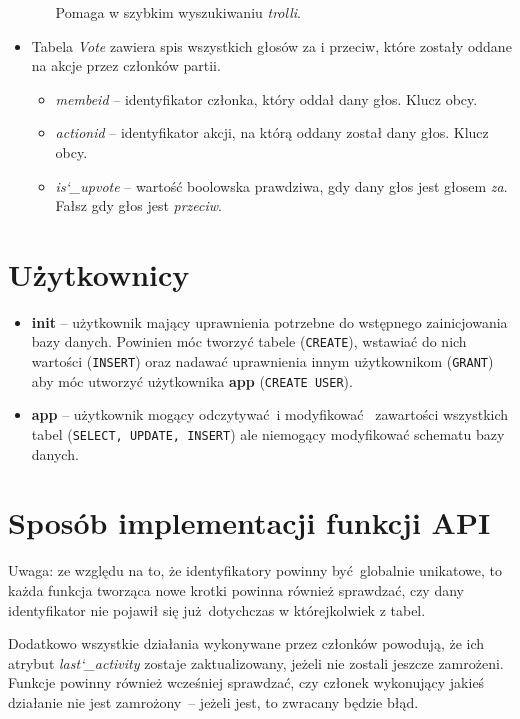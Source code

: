 \documentclass[12pt]{article}
\begin{document}
\begin{itemize}
\begin{itemize}
{              Pomaga w szybkim wyszukiwaniu \textit{trolli}.}
    \end{itemize}
    \item{Tabela \textit{Vote} zawiera spis wszystkich głosów za i przeciw, 
          które zostały oddane na akcje przez członków partii.}
    \begin{itemize}
        \item{\textit{membeid} -- identyfikator członka, który oddał dany głos.
              Klucz obcy.}
        \item{\textit{actionid} -- identyfikator akcji, na którą oddany został
              dany głos. Klucz obcy.}
        \item{\textit{is\char`_upvote} -- wartość boolowska prawdziwa, gdy dany
              głos jest głosem \textit{za}. Fałsz gdy głos jest \textit{przeciw}.}
    \end{itemize}
\end{itemize}

\section{Użytkownicy}

\begin{itemize}
    \item{\textbf{init}} -- użytkownik mający uprawnienia potrzebne do
          wstępnego zainicjowania bazy danych. Powinien móc tworzyć tabele
          (\texttt{CREATE}), wstawiać do nich wartości (\texttt{INSERT})
          oraz nadawać uprawnienia innym użytkownikom (\texttt{GRANT}) aby
          móc utworzyć użytkownika \textbf{app} (\texttt{CREATE USER}).
    \item{\textbf{app}} -- użytkownik mogący odczytywać i modyfikować 
          zawartości wszystkich tabel (\texttt{SELECT, UPDATE, INSERT}) ale 
          niemogący modyfikować schematu bazy danych.
\end{itemize}

\section{Sposób implementacji funkcji API}

Uwaga: ze względu na to, że identyfikatory powinny być globalnie unikatowe, to
każda funkcja tworząca nowe krotki powinna również sprawdzać, czy dany identyfikator
nie pojawił się już dotychczas w którejkolwiek z tabel.

Dodatkowo wszystkie działania wykonywane przez członków powodują, że ich atrybut
\textit{last\char`_activity} zostaje zaktualizowany, jeżeli nie zostali jeszcze
zamrożeni. Funkcje powinny również wcześniej sprawdzać, czy członek wykonujący 
jakieś działanie nie jest zamrożony -- jeżeli jest, to zwracany będzie błąd.
\end{document}
